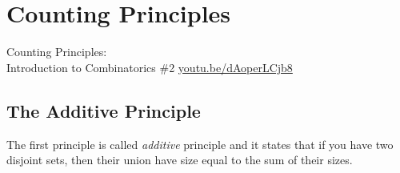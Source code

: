 \chapter{Counting Principles}
\begin{marginfigure}
  {\scriptsize Counting Principles:\\\noindent
  Introduction to Combinatorics \#2}
  \vskip 0.25cm
  \noindent
  \vskip 0.25cm
  \noindent
  \url{youtu.be/dAoperLCjb8}
\end{marginfigure}
\section{The Additive Principle}
The first principle is called \textit{additive} principle and it states that if
you have two disjoint sets, then their union have size equal to the sum of their
sizes.

